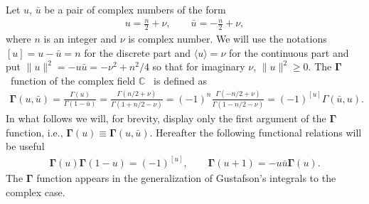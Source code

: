 \documentclass[11pt]{article}
\numberwithin{equation}{section}
\numberwithin{equation}{section}
\begin{document}
Let $u$, $\bar u$ be a pair of complex numbers of the form
\begin{gather}\label{def:z}
u=\frac n2+\nu, \qquad \bar u=-\frac n2+\nu,
\end{gather}
where $n$ is an integer and $\nu$ is complex number. We will use the notations $[u] = u-\bar u=n$ for the discrete
part and $\langle u \rangle = \nu$ for the continuous part and put $\|u\|^2=-u\bar u= -\nu^2+n^2/4$ so that for
imaginary $\nu$, $\|u\|^2\geq 0$. The $\boldsymbol \Gamma$~function of the complex field $\mathbb C$~\cite{GelfandGraevRetakh04} is defined as
\begin{gather*}
{\boldsymbol{\Gamma}}(u,\bar u)=\frac{\Gamma(u)}{\Gamma(1-\bar u)}
=\frac{\Gamma(n/2+\nu)}{\Gamma(1+n/2-\nu)}=(-1)^n\frac{\Gamma(-n/2+\nu)}{\Gamma(1-n/2-\nu)} =(-1)^{[u]}\Gamma(\bar u, u).
\end{gather*}
In what follows we will, for brevity, display only the first argument of the $\boldsymbol \Gamma$ function, i.e.,
$\boldsymbol \Gamma(u)\equiv \boldsymbol \Gamma(u,\bar u)$. Hereafter the following functional relations will be useful
\begin{gather}\label{func:gamma}
\boldsymbol \Gamma(u)\boldsymbol \Gamma(1-u)=(-1)^{[u]}, \qquad
\boldsymbol \Gamma(u+1)=-u\bar u \boldsymbol \Gamma(u).
\end{gather}
The $\boldsymbol \Gamma$ function appears in the generalization of Gustafson's integrals to the complex case.
\end{document}
